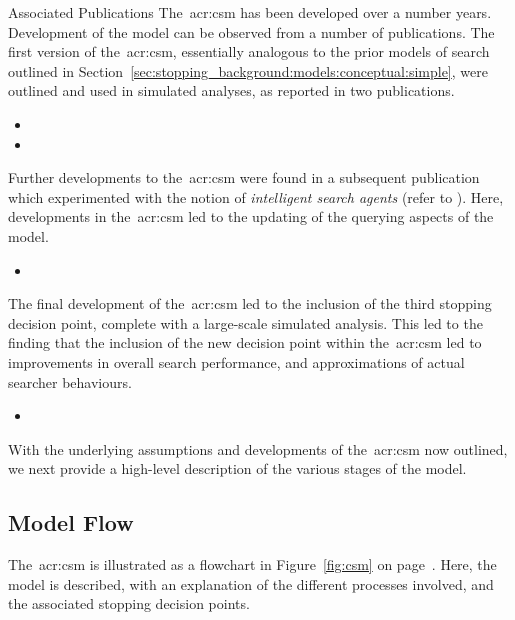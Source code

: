 \vspace*{5mm}
\begin{publications_box}{Associated Publications}
The~\gls{acr:csm} has been developed over a number years. Development of the model can be observed from a number of publications. The first version of the~\gls{acr:csm}, essentially analogous to the prior models of search outlined in Section~\ref{sec:stopping_background:models:conceptual:simple}, were outlined and used in simulated analyses, as reported in two publications.

\begin{itemize}
    \item{}
    \item{}
\end{itemize}

Further developments to the~\gls{acr:csm} were found in a subsequent publication which experimented with the notion of \emph{intelligent search agents} (refer to ). Here, developments in the~\gls{acr:csm} led to the updating of the querying aspects of the model.

\begin{itemize}
    \item{}
\end{itemize}

The final development of the~\gls{acr:csm} led to the inclusion of the third stopping decision point, complete with a large-scale simulated analysis. This led to the finding that the inclusion of the new decision point within the~\gls{acr:csm} led to improvements in overall search performance, and approximations of actual searcher behaviours.

\begin{itemize}
    \item{}
\end{itemize}
\end{publications_box}

With the underlying assumptions and developments of the~\gls{acr:csm} now outlined, we next provide a high-level description of the various stages of the model.

\subsection{Model Flow}\label{sec:proposal:csm:flow}
The~\gls{acr:csm} is illustrated as a flowchart in Figure~\ref{fig:csm} on page~\pageref{fig:csm}. Here, the model is described, with an explanation of the different processes involved, and the associated stopping decision points.

